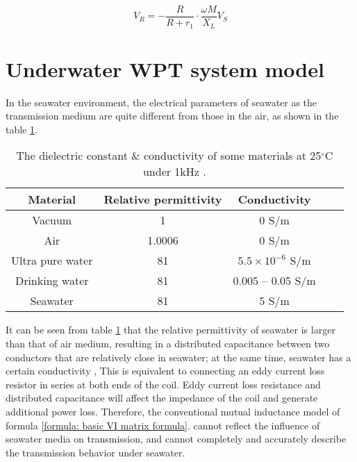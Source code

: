 \begin{equation}
    V_R = - \frac{R}{R+r_1}\cdot \frac{\omega M}{X_L}V_S
\end{equation}

\section{Underwater WPT system model}

In the seawater environment, the electrical parameters of seawater as the transmission medium are quite different from those in the air, as shown in the table \ref{table:permittivity}.
\begin{table}[htbp]
    \centering
    \caption{The dielectric constant \& conductivity of some materials at 25$^\circ$C under 1kHz \cite{Wikipedia2020, Lenntech2021}.}
    \begin{tabular}{ |c|c|c|m{3.5cm}<{\centering}|m{3.5cm}<{\centering}| }
        \hline
        \textbf{Material} & \textbf{Relative permittivity} & \textbf{Conductivity}    \\\hline
        Vacuum            & 1                              & 0 S/m                    \\ \hline
        Air               & 1.0006                         & 0 S/m                    \\ \hline
        Ultra pure water  & 81                             & $5.5 \times 10^{-6}$ S/m \\ \hline
        Drinking water    & 81                             & 0.005 – 0.05 S/m         \\ \hline
        Seawater          & 81                             & 5 S/m                    \\ \hline
    \end{tabular}
    \label{table:permittivity}
\end{table}

It can be seen from table \ref{table:permittivity} that the relative permittivity of seawater is larger than that of air medium, resulting in a distributed capacitance between two conductors that are relatively close in seawater; at the same time, seawater has a certain conductivity , This is equivalent to connecting an eddy current loss resistor in series at both ends of the coil. Eddy current loss resistance and distributed capacitance will affect the impedance of the coil and generate additional power loss. Therefore, the conventional mutual inductance model of formula \ref{formula: basic VI matrix formula}. cannot reflect the influence of seawater media on transmission, and cannot completely and accurately describe the transmission behavior under seawater.

